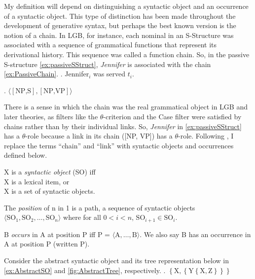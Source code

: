 \documentclass[MilwayThesis]{subfiles}
\begin{document}
My definition will depend on distinguishing a syntactic object and an occurrence of a syntactic object.
This type of distinction has been made throughout the development of generative syntax, but perhaps the best known version is the notion of a chain.
In LGB, for instance, each nominal in an S-Structure was associated with a sequence of grammatical functions that represent its derivational history.
This sequence was called a function chain.
So, in the passive S-structure \cref{ex:passiveSStruct}, \textit{Jennifer} is associated with the chain \cref{ex:PassiveChain}.
\ex.\label{ex:passiveSStruct} Jennifer$_i$ was served $t_i$.

\ex.\label{ex:PassiveChain} $\langle\left[\text{NP,S}\right], \left[\text{NP,VP}\right]\rangle$

There is a sense in which the chain was the real grammatical object in LGB and later theories, as filters like the $\theta$-criterion and the Case filter were satisfied by chains rather than by their individual links.
So, \textit{Jennifer} in \cref{ex:passiveSStruct} has a $\theta$-role because a link in its chain ([NP, VP]) has a $\theta$-role.
Following \textcite{collins2016formalization}, I replace the terms ``chain'' and ``link'' with syntactic objects and occurrences defined below.
\begin{defn}
  X is a \textit{syntactic object} (SO) iff\\
    X is a lexical item, or\\
    X is a set of syntactic objects. \parencite[Modified from][]{collins2016formalization}
  \label{def:so}
\end{defn}
\begin{defn}[Position]
  The \textit{position} of n in 1 is a path, a sequence of syntactic objects $\langle\text{SO}_1,\text{SO}_2,\dots,\text{SO}_n\rangle$ where for all $0 < i < n$, $\text{SO}_{i + 1} \in \text{SO}_i$. \parencite{collins2016formalization}
  \label{def:position}
\end{defn}
\begin{defn}[Occurrence]
  B \textit{occurs} in A at position P iff P = $\langle\text{A},\dots,\text{B}\rangle$. We also say B has an occurrence in A at position P (written P).
  \label{def:occurrence}
\end{defn}

Consider the abstract syntactic object and its tree representation below in \cref{ex:AbstractSO} and \cref{fig:AbstractTree}, respectively.
\ex.\label{ex:AbstractSO} $\left\{ \text{X}, \left\{ \text{Y} \left\{ \text{X}, \text{Z} \right\} \right\} \right\}$
\end{document}
